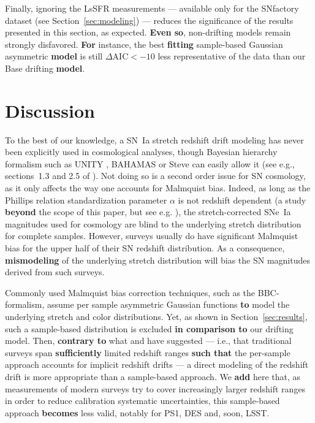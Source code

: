\documentclass[referee]{aa}
\begin{document}
Finally, ignoring the LsSFR measurements --- available only for the SNfactory
dataset (see Section~\ref{sec:modeling}) --- reduces the significance of the
results presented in this section, as expected. \textbf{Even so}, non-drifting
models remain strongly disfavored. \textbf{For} instance, the best
\textbf{fitting} sample-based Gaussian asymmetric \textbf{model} is still
$\Delta\mathrm{AIC}<-10$ less representative of the data than our Base drifting
\textbf{model}.

\section{Discussion}\label{sec:discussion}

To the best of our knowledge, a SN~Ia stretch redshift drift modeling has never
been explicitly used in cosmological analyses, though Bayesian hierarchy
formalism such as UNITY \citep{rubin2015}, BAHAMAS \citep{shariff2016} or Steve
\citep{hinton2019} can easily allow it (see e.g., sections~1.3 and 2.5 of
\cite{rubin2015}). Not doing so is a second order issue for SN cosmology, as it
only affects the way one accounts for Malmquist bias. Indeed, as long as the
Phillips relation \citep{phillips1993} standardization parameter $\alpha$ is not
redshift dependent (a study \textbf{beyond} the scope of this paper, but see
e.g. \citealt{scolnic2018a}), the stretch-corrected SNe~Ia magnitudes used for
cosmology are blind to the underlying stretch distribution for complete samples.
However, surveys usually do have significant Malmquist bias for the upper half
of their SN redshift distribution. As a consequence, \textbf{mismodeling} of the
underlying stretch distribution will bias the SN magnitudes derived from such
surveys. 

Commonly used Malmquist bias correction techniques, such as the BBC-formalism,
assume per sample asymmetric Gaussian functions \textbf{to} model the underlying
stretch and color distributions. Yet, as shown in Section~\ref{sec:results},
such a sample-based distribution is excluded \textbf{in comparison to} our
drifting model. Then, \textbf{contrary to} what \citet[][Section~2]{scolnic2016}
and \citet[][Section~5.4]{scolnic2018a} have suggested --- i.e., that
traditional surveys span \textbf{sufficiently} limited redshift ranges
\textbf{such that} the per-sample approach accounts for implicit redshift drifts
--- a direct modeling of the redshift drift is more appropriate than a
sample-based approach. We \textbf{add} here that, as measurements of modern
surveys try to cover increasingly larger redshift ranges in order to reduce
calibration systematic uncertainties, this sample-based approach
\textbf{becomes} less valid, notably for PS1, DES and, soon, LSST.
\end{document}
